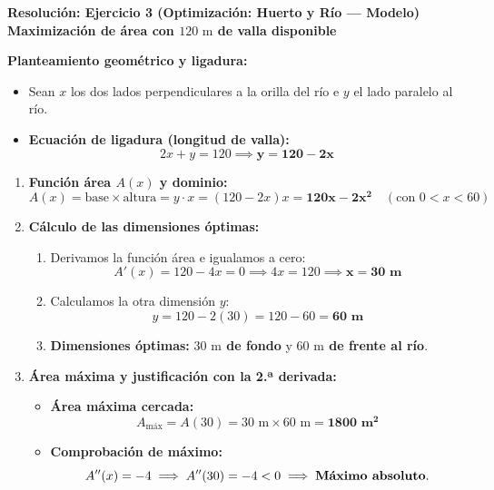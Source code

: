 \documentclass[11pt,a4paper]{article}
\begin{document}
\newpage

\begin{center}
    {\LARGE \textbf{Resolución: Ejercicio 3 (Optimización: Huerto y Río — Modelo)}}\\[4pt]
    {\large \textbf{Maximización de área con $120\text{ m}$ de valla disponible}}
\end{center}

\vspace{0.4cm}
\noindent\textbf{Planteamiento geométrico y ligadura:}
\begin{itemize}[leftmargin=1.5em, itemsep=3pt]
    \item Sean $x$ los dos lados perpendiculares a la orilla del río e $y$ el lado paralelo al río.
    \item \textbf{Ecuación de ligadura (longitud de valla):}
    \[
    2x + y = 120 \implies \mathbf{y = 120 - 2x}
    \]
\end{itemize}

\vspace{0.2cm}
\begin{enumerate}[label=\textbf{\alph*)}, leftmargin=2em, itemsep=8pt]
    \item \textbf{Función área $A(x)$ y dominio:}
    \[
    A(x) = \text{base} \times \text{altura} = y \cdot x = (120 - 2x)x = \mathbf{120x - 2x^2} \quad (\text{con } 0 < x < 60)
    \]

    \item \textbf{Cálculo de las dimensiones óptimas:}
    \begin{enumerate}[label=\arabic*., leftmargin=1.5em, itemsep=2pt]
        \item Derivamos la función área e igualamos a cero:
        \[
        A'(x) = 120 - 4x = 0 \implies 4x = 120 \implies \mathbf{x = 30\text{ m}}
        \]
        \item Calculamos la otra dimensión $y$:
        \[
        y = 120 - 2(30) = 120 - 60 = \mathbf{60\text{ m}}
        \]
        \item \textbf{Dimensiones óptimas:} \textbf{$30\text{ m}$ de fondo} y \textbf{$60\text{ m}$ de frente al río}.
    \end{enumerate}

    \item \textbf{Área máxima y justificación con la 2.ª derivada:}
    \begin{itemize}[leftmargin=1.5em, itemsep=2pt]
        \item \textbf{Área máxima cercada:}
        \[
        A_{\text{máx}} = A(30) = 30\text{ m} \times 60\text{ m} = \mathbf{1800\text{ m}^2}
        \]
        \item \textbf{Comprobación de máximo:}
        \[
        A''(x) = -4 \implies A''(30) = -4 < 0 \implies \text{\textbf{Máximo absoluto}}.
        \]
    \end{itemize}
\end{enumerate}
\end{document}
